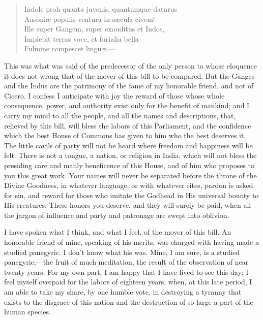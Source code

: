 \begin{verse}
Indole proh quanta juvenis, quantumque daturus \\
Ausoniæ populis ventura in sæcula civem! \\
Ille super Gangem, super exauditus et Indos, \\
Implebit terras voce, et furialia bella \\
Fulmine compescet linguæ.—
\end{verse}

This was what was said of the predecessor of the only person to whose eloquence it does not wrong that of the mover of this bill to be compared. But the Ganges and the Indus are the patrimony of the fame of my honorable friend, and not of Cicero. I confess I anticipate with joy the reward of those whose whole consequence, power, and authority exist only for the benefit of mankind; and I carry my mind to all the people, and all the names and descriptions, that, relieved by this bill, will bless the labors of this Parliament, and the confidence which the best House of Commons has given to him who the best deserves it. The little cavils of party will not be heard where freedom and happiness will be felt. There is not a tongue, a nation, or religion in India, which will not bless the presiding care and manly beneficence of this House, and of him who proposes to you this great work. Your names will never be separated before the throne of the Divine Goodness, in whatever language, or with whatever rites, pardon is asked for sin, and reward for those who imitate the Godhead in His universal bounty to His creatures. These honors you deserve, and they will surely be paid, when all the jargon of influence and party and patronage are swept into oblivion.

I have spoken what I think, and what I feel, of the mover of this bill. An honorable friend of mine, speaking of his merits, was charged with having made a studied panegyric. I don't know what his was. Mine, I am sure, is a studied panegyric,—the fruit of much meditation, the result of the observation of near twenty years. For my own part, I am happy that I have lived to see this day; I feel myself overpaid for the labors of eighteen years, when, at this late period, I am able to take my share, by one humble vote, in destroying a tyranny that exists to the disgrace of this nation and the destruction of so large a part of the human species.


